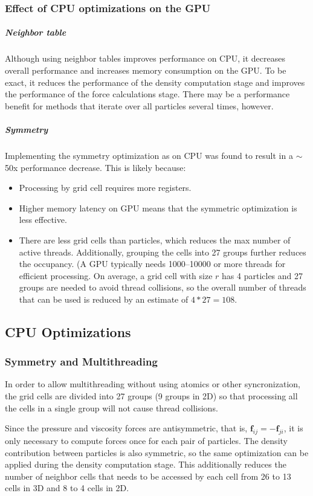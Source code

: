 \documentclass[]{article}
\begin{document}
		\subsubsection{Effect of CPU optimizations on the GPU}
			\subparagraph{Neighbor table}
				Although using neighbor tables improves performance on CPU, it decreases overall performance and 
				increases memory consumption on the GPU. To be exact, it reduces the performance of the density
				computation stage and improves the performance of the force calculations stage. There may be a 
				performance benefit for methods that iterate over all particles several times, however.
			\subparagraph{Symmetry}
				Implementing the symmetry optimization as on CPU was found to result in a \(\sim\)50x performance decrease.
				This is likely because:
				\begin{itemize}
					\item Processing by grid cell requires more registers.
					\item Higher memory latency on GPU means that the symmetric optimization is less effective.
					\item There are less grid cells than particles, which reduces the max number of active threads.
					Additionally, grouping the cells into 27 groups further reduces the occupancy. (A GPU typically needs
					1000--10000 or more threads for efficient processing. On average, a grid cell with size \(r\) has 4
					particles and 27 groups are needed to avoid thread collisions, so the overall number of threads that
					can be used is reduced by an estimate of \(4 * 27 = 108\).
				\end{itemize}
			
	\subsection{CPU Optimizations}
		\subsubsection{Symmetry and Multithreading}
			In order to allow multithreading without using atomics or other syncronization, the grid cells are divided 
			into 27 groups (9 groups in 2D) so that processing all the cells in a single group will not cause thread 
			collisions.
			
			Since the pressure and viscosity forces are antisymmetric, that is, \(\mathbf{f}_{ij} = - \mathbf{f}_{ji}\),
			it is only necessary to compute forces once for each pair of particles. The density contribution between 
			particles is also symmetric, so the same optimization can be applied during the density computation stage. 
			This additionally reduces the number of neighbor cells that needs to be accessed by each cell from 26 to 
			13 cells in 3D and 8 to 4 cells in 2D.
			
\end{document}
